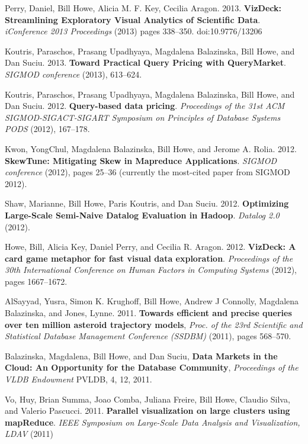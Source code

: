 \begin{bulletlist}
\item Perry, Daniel, Bill Howe, Alicia M. F. Key, Cecilia Aragon. 2013. 
\textbf{VizDeck: Streamlining Exploratory Visual Analytics of Scientific Data}.
\emph{iConference 2013 Proceedings} (2013) pages 338--350. doi:10.9776/13206 

\item Koutris, Paraschos, Prasang Upadhyaya, Magdalena
Balazinska, Bill Howe, and Dan Suciu. 2013. \textbf{Toward Practical Query
Pricing with QueryMarket}. \emph{SIGMOD conference} (2013), 613--624.

\item Koutris, Paraschos, Prasang Upadhyaya, Magdalena Balazinska, Bill
Howe, and Dan Suciu. 2012. \textbf{Query-based data pricing}. \emph{Proceedings of the 31st ACM SIGMOD-SIGACT-SIGART Symposium on Principles of Database Systems {PODS}} (2012),
167--178. 

\item Kwon, YongChul, Magdalena
Balazinska, Bill Howe, and Jerome A. Rolia. 2012. \textbf{SkewTune: Mitigating
Skew in Mapreduce Applications}. \emph{SIGMOD conference} (2012), pages 25--36 (currently the most-cited paper from SIGMOD 2012).

\item Shaw, Marianne, Bill Howe, Paris Koutris, and
Dan Suciu. 2012. \textbf{Optimizing Large-Scale Semi-Naive Datalog Evaluation in
Hadoop}. \emph{Datalog 2.0} (2012). 

\item Howe, Bill, Alicia Key, Daniel Perry, and Cecilia R. Aragon. 2012. 
\textbf{VizDeck: A card game metaphor for fast visual data exploration}. \emph{Proceedings of the 30th International Conference on Human Factors in Computing Systems} (2012), pages 1667--1672. 

\item AlSayyad, Yusra, Simon K. Krughoff, Bill Howe, Andrew J Connolly, Magdalena Balazinska,
and Jones, Lynne. 2011. \textbf{Towards efficient and precise queries over ten million asteroid trajectory models}, \emph{Proc. of the 23rd Scientific and Statistical
Database Management Conference (SSDBM)} (2011), pages 568--570.

\item Balazinska, Magdalena, Bill Howe, and Dan Suciu,
\textbf{Data Markets in the Cloud: An Opportunity for the Database Community},
\emph{Proceedings of the VLDB Endowment} PVLDB, 4, 12, 2011. 

\item Vo, Huy, Brian Summa, Joao Comba, Juliana Freire, Bill Howe, Claudio Silva, and Valerio
Pascucci. 2011. \textbf{Parallel visualization on large clusters using
mapReduce}. \emph{{IEEE} Symposium on Large-Scale Data Analysis and Visualization, {LDAV}}
(2011)


\end{bulletlist}
